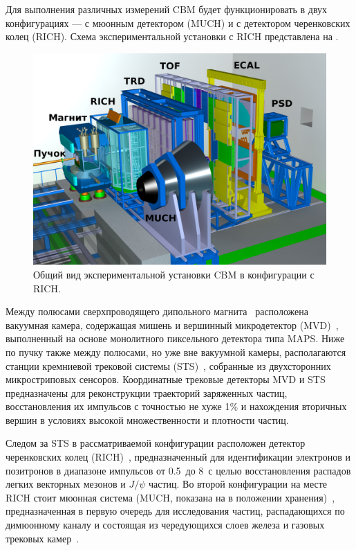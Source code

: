 Для выполнения различных измерений CBM будет функционировать в двух конфигурациях --- с мюонным детектором (MUCH) и с детектором черенковских колец (RICH). Схема экспериментальной установки с RICH представлена на .

\begin{figure}[H]
\includegraphics[width=1.0\textwidth]{pictures/1_CBM_SIS100_with_names.png}
\caption{Общий вид экспериментальной установки CBM в конфигурации с RICH.}
\label{fig:CBM}
\end{figure}

Между полюсами сверхпроводящего дипольного магнита~\cite{TDR_Magnet} расположена вакуумная камера, содержащая мишень и вершинный микродетектор (MVD)~\cite{MVD_KOZIEL}, выполненный на основе монолитного пиксельного детектора типа MAPS. Ниже по пучку также между полюсами, но уже вне вакуумной камеры, располагаются станции кремниевой трековой системы (STS)~\cite{TDR_STS}, собранные из двухсторонних микростриповых сенсоров. Координатные трековые детекторы MVD и STS предназначены для реконструкции траекторий заряженных частиц, восстановления их импульсов с точностью не хуже 1\% и нахождения вторичных вершин в условиях высокой множественности и плотности частиц.

Следом за STS в рассматриваемой конфигурации расположен детектор черенковских колец (RICH)~\cite{TDR_RICH}, предназначенный для идентификации электронов и позитронов в диапазоне импульсов от 0.5~\GeVoverC до 8~\GeVoverC с целью восстановления распадов легких векторных мезонов и $ J / \psi $ частиц. Во второй конфигурации на месте RICH стоит мюонная система (MUCH, показана на  в положении хранения)~\cite{TDR_MUCH}, предназначенная в первую очередь для исследования частиц, распадающихся по димюонному каналу и состоящая из чередующихся слоев железа и газовых трековых камер~\cite{GEM}.

